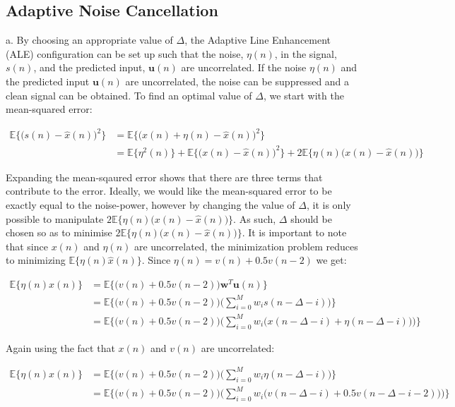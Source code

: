 \subsection{Adaptive Noise Cancellation}

\noindent{}a. By choosing an appropriate value of $\Delta$, the Adaptive Line Enhancement (ALE) configuration can be set up such that the noise, $\eta(n)$, in the signal, $s(n)$, and the predicted input, $\textbf{u}(n)$ are uncorrelated. If the noise $\eta(n)$ and the predicted input $\textbf{u}(n)$ are uncorrelated, the noise can be suppressed and a clean signal can be obtained. To find an optimal value of $\Delta$, we start with the mean-squared error:

\begin{align*}
\mathbb{E}\bigg\{\bigg(s(n)-\hat{x}(n)\bigg)^2\bigg\} &= \mathbb{E}\bigg\{\bigg(x(n)+\eta(n)-\hat{x}(n)\bigg)^2\bigg\} \\
&=\mathbb{E}\{\eta^2(n)\} + \mathbb{E}\bigg\{\bigg(x(n)-\hat{x}(n)\bigg)^2\bigg\} + 2\mathbb{E}\bigg\{\eta(n)\bigg(x(n)-\hat{x}(n)\bigg)\bigg\}
\end{align*}

\noindent{}Expanding the mean-sqaured error shows that there are three terms that contribute to the error. Ideally, we would like the mean-squared error to be exactly equal to the noise-power, however by changing the value of $\Delta$, it is only possible to manipulate $2\mathbb{E}\bigg\{\eta(n)\bigg(x(n)-\hat{x}(n)\bigg)\bigg\}$. As such, $\Delta$ should be chosen so as to minimise $2\mathbb{E}\bigg\{\eta(n)\bigg(x(n)-\hat{x}(n)\bigg)\bigg\}$. It is important to note that since $x(n)$ and $\eta(n)$ are uncorrelated, the minimization problem reduces to minimizing $\mathbb{E}\{\eta(n)\hat{x}(n)\}$. Since $\eta(n)=v(n) + 0.5v(n-2)$ we get:

\begin{align*}
\mathbb{E}\{\eta(n)\hat{x}(n)\} &= \mathbb{E}\bigg\{\bigg( v(n) + 0.5v(n-2)\bigg) \textbf{w}^T \textbf{u}(n)\bigg\} \\
&= \mathbb{E}\bigg\{\bigg( v(n) + 0.5v(n-2)\bigg) \bigg(\sum_{i=0}^{M}w_{i}s(n-\Delta-i)\bigg)\bigg\} \\
&= \mathbb{E}\bigg\{\bigg( v(n) + 0.5v(n-2)\bigg) \bigg(\sum_{i=0}^{M}w_{i}\big(x(n-\Delta-i)+\eta(n-\Delta-i)\big)\bigg)\bigg\} 
\end{align*}

\noindent{}Again using the fact that $x(n)$ and $v(n)$ are uncorrelated:

\begin{align*}
\mathbb{E}\{\eta(n)\hat{x}(n)\} &= \mathbb{E}\bigg\{\bigg( v(n) + 0.5v(n-2)\bigg) \bigg(\sum_{i=0}^{M}w_{i}\eta(n-\Delta-i)\bigg)\bigg\} \\
&= \mathbb{E}\bigg\{\bigg( v(n) + 0.5v(n-2)\bigg) \bigg(\sum_{i=0}^{M}w_{i}\big(v(n-\Delta-i)+0.5v(n-\Delta-i-2)\big)\bigg)\bigg\}
\end{align*}

